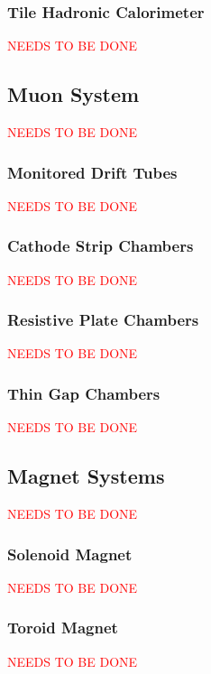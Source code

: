 		\subsubsection{Tile Hadronic Calorimeter}{
			\textcolor{red}{NEEDS TO BE DONE}
		}

	\subsection{Muon System}{
		\textcolor{red}{NEEDS TO BE DONE}
	}

		\subsubsection{Monitored Drift Tubes}{
			\textcolor{red}{NEEDS TO BE DONE}
		}

		\subsubsection{Cathode Strip Chambers}{
			\textcolor{red}{NEEDS TO BE DONE}
		}

		\subsubsection{Resistive Plate Chambers}{
			\textcolor{red}{NEEDS TO BE DONE}
		}

		\subsubsection{Thin Gap Chambers}{
			\textcolor{red}{NEEDS TO BE DONE}
		}

	\subsection{Magnet Systems}{
		\textcolor{red}{NEEDS TO BE DONE}
	}

		\subsubsection{Solenoid Magnet}{
			\textcolor{red}{NEEDS TO BE DONE}
		}

		\subsubsection{Toroid Magnet}{
			\textcolor{red}{NEEDS TO BE DONE}
		}

		